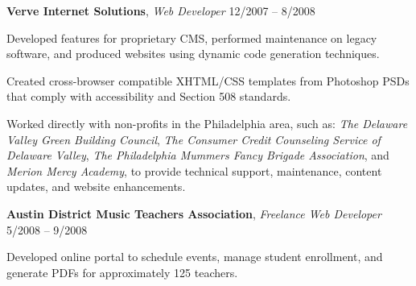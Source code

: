 \documentclass[12pt,a4paper]{article}
\newcommand{\workhead}[3]{\textbf{#1}, \emph{#2} \hfill #3}
\newcommand{\li}{\item[--]}
\begin{document}
\begin{description}[leftmargin=0em]
    \item 
        \workhead{Verve Internet Solutions}{Web Developer}{12/2007 -- 8/2008}
        \begin{itemize*}
            \li Developed features for proprietary CMS, performed maintenance on legacy software, and produced websites using dynamic code generation techniques.
            \li Created cross-browser compatible XHTML/CSS templates from Photoshop PSDs that comply with accessibility and Section 508 standards.
            \li Worked directly with non-profits in the Philadelphia area, such as: \emph{The Delaware Valley Green Building Council}, \emph{The Consumer Credit Counseling Service of Delaware Valley}, \emph{The Philadelphia Mummers Fancy Brigade Association}, and \emph{Merion Mercy Academy}, to provide technical support, maintenance, content updates, and website enhancements.
        \end{itemize*}

    \item
        \workhead{Austin District Music Teachers Association}{Freelance Web Developer}{5/2008 -- 9/2008}
        \begin{itemize*}
            \li Developed online portal to schedule events, manage student enrollment, and generate PDFs for approximately 125 teachers.
        \end{itemize*}


\end{description}
\end{document}
